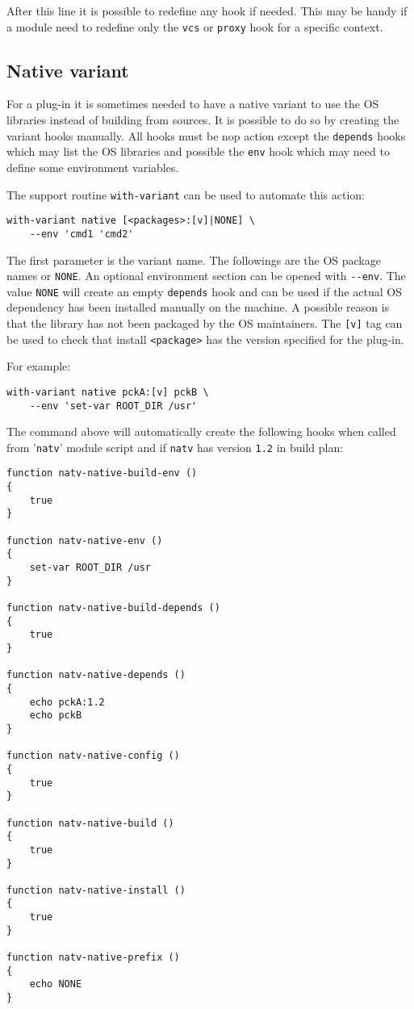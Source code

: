 \documentclass[a4paper,12pt,twoside]{article}
\newcommand{\code}[1]{\texttt{#1}}
\newcommand{\file}[1]{'{\texttt{#1}}'}
\newcommand{\ddash}{-{}-}
\begin{document}
After this line it is possible to redefine any hook if needed. This may be handy if a module need to redefine only
the \code{vcs} or \code{proxy} hook for a specific context.

\subsection{Native variant}
\label{native variant}

For a plug-in it is sometimes needed to have a native variant to use the OS libraries instead of building from sources. It is possible to do so by creating the variant hooks manually. All hooks must be nop action except the \code{depends} hooks which may list the OS libraries and possible the \code{env} hook which may need to define some environment variables.

The support routine \code{with-variant} can be used to automate this action:

\begin{lstlisting}
with-variant native [<packages>:[v]|NONE] \
	--env 'cmd1 'cmd2'
\end{lstlisting}

The first parameter is the variant name. The followings are the OS package names or \code{NONE}. An optional environment section can be opened with \code{\ddash{}env}. The value \code{NONE} will create an empty \code{depends} hook and can be used if the actual OS dependency has been installed manually on the machine. A possible reason is that the library has not been packaged by the OS maintainers. The \code{[v]} tag can be used to check that install \code{<package>} has the version specified for the plug-in.

For example:

\begin{lstlisting}
with-variant native pckA:[v] pckB \
	--env 'set-var ROOT_DIR /usr'
\end{lstlisting}

The command above will automatically create the following hooks when called from \file{natv} module script and if \code{natv} has version \code{1.2} in build plan:

\begin{lstlisting}
function natv-native-build-env ()
{
	true
}

function natv-native-env ()
{
	set-var ROOT_DIR /usr
}

function natv-native-build-depends ()
{
	true
}

function natv-native-depends ()
{
	echo pckA:1.2
	echo pckB
}

function natv-native-config ()
{
	true
}

function natv-native-build ()
{
	true
}

function natv-native-install ()
{
	true
}

function natv-native-prefix ()
{
	echo NONE
}
\end{lstlisting}
\end{document}
